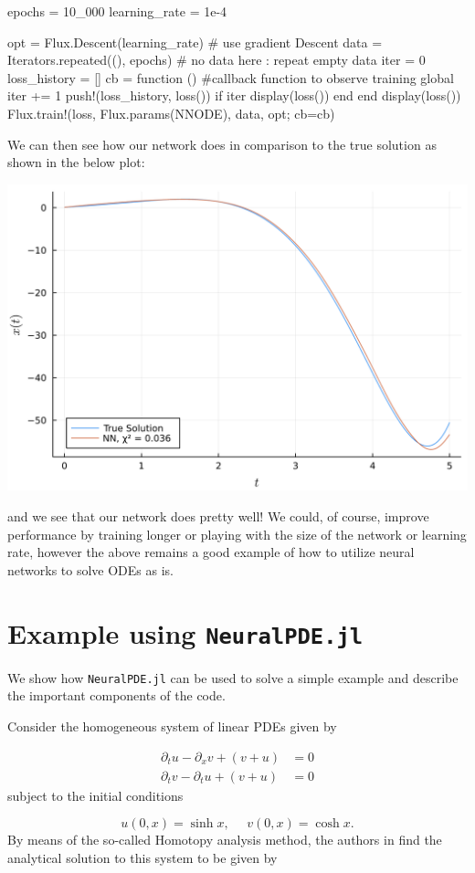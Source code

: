 \documentclass{CUP-JNL-DTM}%
\theoremstyle{definition}
\numberwithin{equation}{section}
\begin{document}
\begin{jllisting}
epochs = 10_000
learning_rate = 1e-4

opt = Flux.Descent(learning_rate) # use gradient Descent
data = Iterators.repeated((), epochs) # no data here : repeat empty data
iter = 0
loss_history = []
cb = function () #callback function to observe training
  global iter += 1
  push!(loss_history, loss())
  if iter %
    display(loss())
  end
end
display(loss())
Flux.train!(loss, Flux.params(NNODE), data, opt; cb=cb)
\end{jllisting}
We can then see how our network does in comparison to the true solution as shown in the below plot:

\begin{center}
\includegraphics[width=0.42\linewidth]{figures/ODE_example.png}
\end{center}
and we see that our network does pretty well! We could, of course, improve performance by training longer or playing with the size of the network or learning rate, however the above remains a good example of how to utilize neural networks to solve ODEs as is. 

\section{Example using \texttt{NeuralPDE.jl}}
\label{neural_PDE_eg}

We show how \texttt{NeuralPDE.jl} can be used to solve a simple example and describe the important components of the code. 

Consider the homogeneous system of linear PDEs given by

\begin{equation}
\begin{split}
	\partial_t u - \partial_x v + (v + u) & = 0 \\
	\partial_t v - \partial_t u + (v + u) & = 0
\end{split}
\end{equation}
subject to the initial conditions 

\begin{equation}
	u(0,x) = \sinh x, \,\,\,\,\,\,\,\, v(0,x) = \cosh x. 
\end{equation}    
By means of the so-called Homotopy analysis method, the authors in \cite{samibatainehApproximateAnalyticalSolutions2008} find the analytical solution to this system to be given by 
\end{document}
